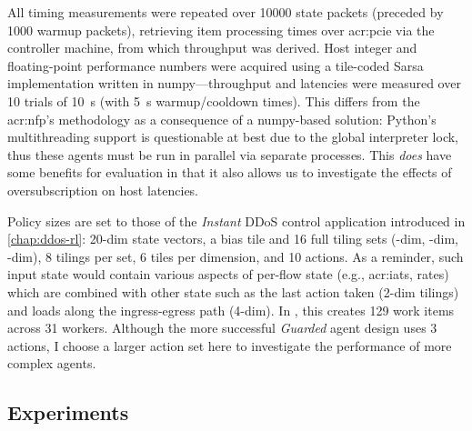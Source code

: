 All \approachshort{} timing measurements were repeated over \num{10000} state packets (preceded by \num{1000} warmup packets), retrieving item processing times over \gls{acr:pcie} via the controller machine, from which throughput was derived.
Host integer and floating-point performance numbers were acquired using a tile-coded Sarsa implementation written in numpy---throughput and latencies were measured over \num{10} trials of \qty{10}{\second} (with \qty{5}{\second} warmup/cooldown times).
This differs from the \gls{acr:nfp}'s methodology as a consequence of a numpy-based solution: Python's multithreading support is questionable at best due to the global interpreter lock, thus these agents must be run in parallel via separate processes.
This \emph{does} have some benefits for evaluation in that it also allows us to investigate the effects of oversubscription on host latencies.

Policy sizes are set to those of the \emph{Instant} DDoS control application introduced in \cref{chap:ddos-rl}: 20-dim state vectors, a bias tile and 16 full tiling sets (-dim, -dim, -dim), 8 tilings per set, 6 tiles per dimension, and 10 actions.
As a reminder, such input state would contain various aspects of per-flow state (e.g., \glspl{acr:iat}, rates) which are combined with other state such as the last action taken (2-dim tilings) and loads along the ingress-egress path (4-dim).
In \Coopfw{}, this creates \num{129} work items across \num{31} workers.
Although the more successful \emph{Guarded} agent design uses 3 actions, I choose a larger action set here to investigate the performance of more complex agents.

\subsection{Experiments}
